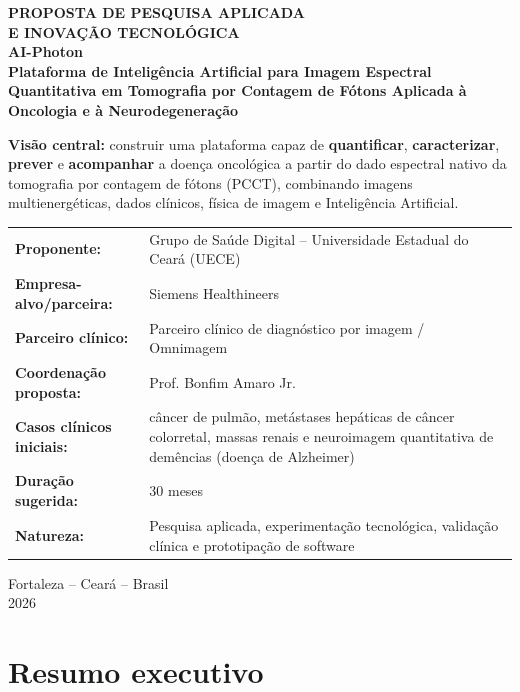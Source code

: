 \documentclass[11pt,a4paper]{article}
\begin{document}
\begin{titlepage}
\begin{center}
\vspace*{1.2cm}
{\large\bfseries\color{titleblue} PROPOSTA DE PESQUISA APLICADA\\E INOVAÇÃO TECNOLÓGICA}\\[1.6cm]
{\Huge\bfseries AI-Photon}\\[0.5cm]
{\LARGE\bfseries Plataforma de Inteligência Artificial para Imagem Espectral Quantitativa em Tomografia por Contagem de Fótons Aplicada à Oncologia e à Neurodegeneração}\\[1.1cm]
\begin{minipage}{0.86\textwidth}
\centering
\textbf{Visão central:} construir uma plataforma capaz de \textbf{quantificar}, \textbf{caracterizar}, \textbf{prever} e \textbf{acompanhar} a doença oncológica a partir do dado espectral nativo da tomografia por contagem de fótons (PCCT), combinando imagens multienergéticas, dados clínicos, física de imagem e Inteligência Artificial.
\end{minipage}
\vfill
\begin{tabular}{>{\bfseries}p{4.6cm}p{9.2cm}}
Proponente: & Grupo de Saúde Digital -- Universidade Estadual do Ceará (UECE)\\
Empresa-alvo/parceira: & Siemens Healthineers\\
Parceiro clínico: & Parceiro clínico de diagnóstico por imagem / Omnimagem\\
Coordenação proposta: & Prof. Bonfim Amaro Jr.\\
Casos clínicos iniciais: & câncer de pulmão, metástases hepáticas de câncer colorretal, massas renais e neuroimagem quantitativa de demências (doença de Alzheimer)\\
Duração sugerida: & 30 meses\\
Natureza: & Pesquisa aplicada, experimentação tecnológica, validação clínica e prototipação de software\\
\end{tabular}
\vspace{1.2cm}

Fortaleza -- Ceará -- Brasil\\2026
\end{center}
\end{titlepage}

\tableofcontents
\newpage

\section{Resumo executivo}
\end{document}
